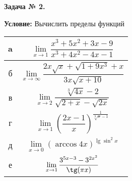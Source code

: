 \documentclass[12pt]{article}
\begin{document}
\newpage
\begin{center}
\textbf{Задача № 2.}   
\end{center}

\textbf{Условие:}
Вычислить пределы функций
\begin{table}[h]
    \centering
    \begin{tabular}{|c|c|}
        \hline
         a & $\lim\limits_{x\rightarrow 1} \dfrac{x^3+5x^2+3x-9}{x^3+4x^2-4x-1}$ \\
         \hline
         б & $\lim\limits_{x\rightarrow\infty} \dfrac{2x\sqrt{x} + \sqrt{1+9x^3}+x}{3x\sqrt{x+10}}$ \\
         \hline
         в & $\lim\limits_{x\rightarrow 2} \dfrac{\sqrt[3]{4x}-2}{\sqrt{2+x}-\sqrt{2x}}$\\
         \hline
         г & $\lim\limits_{x\rightarrow 1} (\dfrac{2x-1}{x})^{\frac{1}{\sqrt[3]{x}-1}}  $\\
         \hline
         д & $\lim\limits_{x\rightarrow 0} ({\arccos{4x}})^{\lg{\sin^2{x}}}$ \\
         \hline
         е & $\lim\limits_{x\rightarrow 1} \dfrac{3^{5x-3} - 3^{2x^{2}}}{\tg(\pi x)}$\\
         \hline
    \end{tabular}
\end{table}
\end{document}
